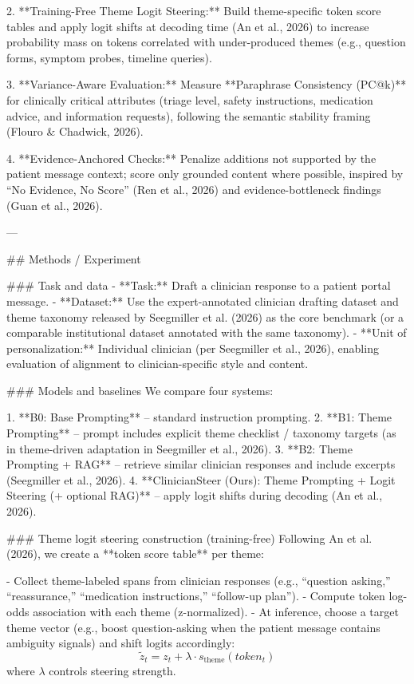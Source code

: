 2. **Training-Free Theme Logit Steering:** Build theme-specific token score tables and apply logit shifts at decoding time (An et al., 2026) to increase probability mass on tokens correlated with under-produced themes (e.g., question forms, symptom probes, timeline queries).

3. **Variance-Aware Evaluation:** Measure **Paraphrase Consistency (PC@k)** for clinically critical attributes (triage level, safety instructions, medication advice, and information requests), following the semantic stability framing (Flouro & Chadwick, 2026).

4. **Evidence-Anchored Checks:** Penalize additions not supported by the patient message context; score only grounded content where possible, inspired by “No Evidence, No Score” (Ren et al., 2026) and evidence-bottleneck findings (Guan et al., 2026).

---

## Methods / Experiment  

### Task and data  
- **Task:** Draft a clinician response to a patient portal message.  
- **Dataset:** Use the expert-annotated clinician drafting dataset and theme taxonomy released by Seegmiller et al. (2026) as the core benchmark (or a comparable institutional dataset annotated with the same taxonomy).  
- **Unit of personalization:** Individual clinician (per Seegmiller et al., 2026), enabling evaluation of alignment to clinician-specific style and content.

### Models and baselines  
We compare four systems:

1. **B0: Base Prompting** – standard instruction prompting.  
2. **B1: Theme Prompting** – prompt includes explicit theme checklist / taxonomy targets (as in theme-driven adaptation in Seegmiller et al., 2026).  
3. **B2: Theme Prompting + RAG** – retrieve similar clinician responses and include excerpts (Seegmiller et al., 2026).  
4. **ClinicianSteer (Ours): Theme Prompting + Logit Steering (+ optional RAG)** – apply logit shifts during decoding (An et al., 2026).

### Theme logit steering construction (training-free)  
Following An et al. (2026), we create a **token score table** per theme:

- Collect theme-labeled spans from clinician responses (e.g., “question asking,” “reassurance,” “medication instructions,” “follow-up plan”).  
- Compute token log-odds association with each theme (z-normalized).  
- At inference, choose a target theme vector (e.g., boost question-asking when the patient message contains ambiguity signals) and shift logits accordingly:
  \[
  \tilde{z}_t = z_t + \lambda \cdot s_{\text{theme}}(token_t)
  \]
where \( \lambda \) controls steering strength.

